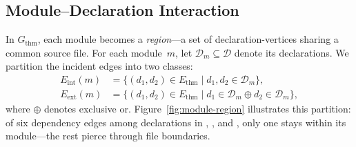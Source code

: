 \subsection{Module--Declaration Interaction}
\label{sec:cohesion}

In $G_{\mathrm{thm}}$, each module becomes a \emph{region}---a set of declaration-vertices sharing a common source file. For each module~$m$, let $\mathcal{D}_m \subseteq \mathcal{D}$ denote its declarations. We partition the incident edges into two classes:
\begin{align*}
  E_{\mathrm{int}}(m) &= \{(d_1, d_2) \in E_{\mathrm{thm}} \mid d_1, d_2 \in \mathcal{D}_m\}, \\
  E_{\mathrm{ext}}(m) &= \{(d_1, d_2) \in E_{\mathrm{thm}} \mid d_1 \in \mathcal{D}_m \oplus d_2 \in \mathcal{D}_m\},
\end{align*}
where $\oplus$ denotes exclusive or. Figure~\ref{fig:module-region} illustrates this partition: of six dependency edges among declarations in , , and , only one stays within its module---the rest pierce through file boundaries.

